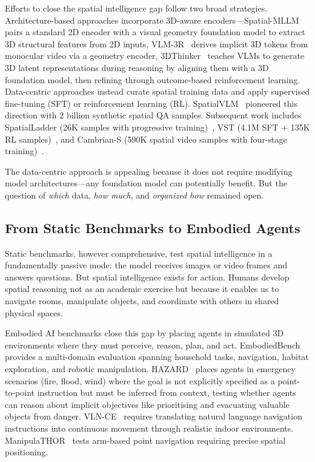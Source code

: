 \documentclass[
hf,
]{confart}
\begin{document}
Efforts to close the spatial intelligence gap follow two broad strategies. Architecture-based approaches incorporate 3D-aware encoders---Spatial-MLLM~\cite{wu2025spatialmllmboostingmllmcapabilities} pairs a standard 2D encoder with a visual geometry foundation model to extract 3D structural features from 2D inputs, VLM-3R~\cite{fan2025vlm3rvisionlanguagemodelsaugmented} derives implicit 3D tokens from monocular video via a geometry encoder, 3DThinker~\cite{chen2026think3dgeometricimagination} teaches VLMs to generate 3D latent representations during reasoning by aligning them with a 3D foundation model, then refining through outcome-based reinforcement learning. Data-centric approaches instead curate spatial training data and apply supervised fine-tuning (SFT) or reinforcement learning (RL). SpatialVLM~\cite{chen2024spatialvlmendowingvisionlanguagemodels} pioneered this direction with 2 billion synthetic spatial QA samples. Subsequent work includes SpatialLadder (26K samples with progressive training)~\cite{li2025spatialladderprogressivetrainingspatial}, VST (4.1M SFT + 135K RL samples)~\cite{yang2025visualspatialtuning}, and Cambrian-S (590K spatial video samples with four-stage training)~\cite{yang2025cambriansspatialsupersensingvideo}.

The data-centric approach is appealing because it does not require modifying model architectures---any foundation model can potentially benefit. But the question of \textit{which} data, \textit{how much}, and \textit{organized how} remained open.

\subsection{From Static Benchmarks to Embodied Agents}

Static benchmarks, however comprehensive, test spatial intelligence in a fundamentally passive mode: the model receives images or video frames and answers questions. But spatial intelligence exists for action. Humans develop spatial reasoning not as an academic exercise but because it enables us to navigate rooms, manipulate objects, and coordinate with others in shared physical spaces.

Embodied AI benchmarks close this gap by placing agents in simulated 3D environments where they must perceive, reason, plan, and act. EmbodiedBench~\cite{yang2025embodiedbenchcomprehensivebenchmarkingmultimodal} provides a multi-domain evaluation spanning household tasks, navigation, habitat exploration, and robotic manipulation. HAZARD~\cite{zhou2024hazardchallengeembodieddecision} places agents in emergency scenarios (fire, flood, wind) where the goal is not explicitly specified as a point-to-point instruction but must be inferred from context, testing whether agents can reason about implicit objectives like prioritising and evacuating valuable objects from danger. VLN-CE~\cite{krantz2020navgraphvisionandlanguagenavigationcontinuous} requires translating natural language navigation instructions into continuous movement through realistic indoor environments. ManipulaTHOR~\cite{ehsani2021manipulathorframeworkvisualobject} tests arm-based point navigation requiring precise spatial positioning.
\end{document}
